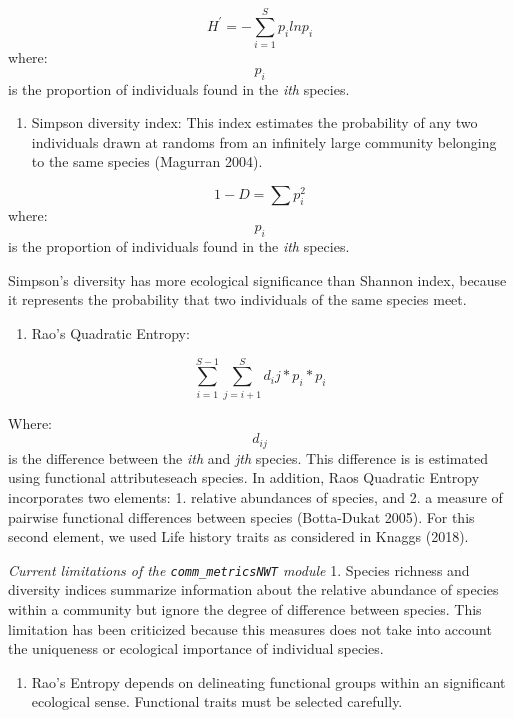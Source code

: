 \documentclass[]{article}
\providecommand{\tightlist}{%
  \setlength{\itemsep}{0pt}\setlength{\parskip}{0pt}}
\begin{document}
\[ H^' = - \sum_{i=1}^{S} p_ilnp_i \] where: \[p_i\] is the proportion
of individuals found in the \emph{ith} species.

\begin{enumerate}
\def\labelenumi{\arabic{enumi}.}
\setcounter{enumi}{2}
\tightlist
\item
  Simpson diversity index: This index estimates the probability of any
  two individuals drawn at randoms from an infinitely large community
  belonging to the same species (Magurran 2004).
\end{enumerate}

\[ 1-D = \sum p_i^2 \] where:\[p_i\] is the proportion of individuals
found in the \emph{ith} species.

Simpson's diversity has more ecological significance than Shannon index,
because it represents the probability that two individuals of the same
species meet.

\begin{enumerate}
\def\labelenumi{\arabic{enumi}.}
\setcounter{enumi}{3}
\tightlist
\item
  Rao's Quadratic Entropy:
\end{enumerate}

\[ \sum_{i=1}^{S-1} \sum_{j=i+1}^{S} d_ij* p_i* p_i\]

Where: \[d_{ij}\] is the difference between the \emph{ith} and
\emph{jth} species. This difference is is estimated using functional
attributes\for each species. In addition, Raos Quadratic Entropy
incorporates two elements: 1. relative abundances of species, and 2. a
measure of pairwise functional differences between species (Botta-Dukat
2005). For this second element, we used Life history traits as
considered in Knaggs (2018).

\emph{Current limitations of the \texttt{comm\_metricsNWT} module} 1.
Species richness and diversity indices summarize information about the
relative abundance of species within a community but ignore the degree
of difference between species. This limitation has been criticized
because this measures does not take into account the uniqueness or
ecological importance of individual species.

\begin{enumerate}
\def\labelenumi{\arabic{enumi}.}
\setcounter{enumi}{1}
\tightlist
\item
  Rao's Entropy depends on delineating functional groups within an
  significant ecological sense. Functional traits must be selected
  carefully.
\end{enumerate}
\end{document}
